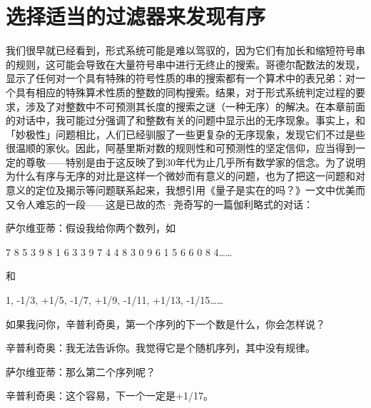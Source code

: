\documentclass[
  12pt,
  twoside,
  openright,
  oldfontcommands,
]{memoir}
\newenvironment{fsquote}{%
  \begin{mdframed}[style=gebquote]\kaitifamily\small%
}{%
  \end{mdframed}%
}
\begin{document}
\section{选择适当的过滤器来发现有序}

我们很早就已经看到，形式系统可能是难以驾驭的，因为它们有加长和缩短符号串的规则，这可能会导致在大量符号串中进行无终止的搜索。哥德尔配数法的发现，显示了任何对一个具有特殊的符号性质的串的搜索都有一个算术中的表兄弟：对一个具有相应的特殊算术性质的整数的同构搜索。结果，对于形式系统判定过程的要求，涉及了对整数中不可预测其长度的搜索之谜（一种无序）的解决。在本章前面的对话中，我可能过分强调了和整数有关的问题中显示出的无序现象。事实上，和「妙极性」问题相比，人们已经驯服了一些更复杂的无序现象，发现它们不过是些很温顺的家伙。因此，阿基里斯对数的规则性和可预测性的坚定信仰，应当得到一定的尊敬------特别是由于这反映了到30年代为止几乎所有数学家的信念。为了说明为什么有序与无序的对比是这样一个微妙而有意义的问题，也为了把这一问题和对意义的定位及揭示等问题联系起来，我想引用《量子是实在的吗？》一文中优美而又令人难忘的一段------这是已故的杰·尧奇写的一篇伽利略式的对话：

\begin{fsquote}
萨尔维亚蒂：假设我给你两个数列，如
\end{fsquote}

\begin{fsquote}
7 8 5 3 9 8 1 6 3 3 9 7 4 4 8 3 0 9 6 1 5 6 6 0 8 4\ldots\ldots{}
\end{fsquote}

和

\begin{fsquote}
1, -1/3, +1/5, -1/7, +1/9, -1/11, +1/13, -1/15\ldots\ldots{}
\end{fsquote}

\begin{fsquote}
如果我问你，辛普利奇奥，第一个序列的下一个数是什么，你会怎样说？
\end{fsquote}

\begin{fsquote}
辛普利奇奥：我无法告诉你。我觉得它是个随机序列，其中没有规律。
\end{fsquote}

\begin{fsquote}
萨尔维亚蒂：那么第二个序列呢？
\end{fsquote}

\begin{fsquote}
辛普利奇奥：这个容易，下一个一定是+1/17。
\end{fsquote}
\end{document}
